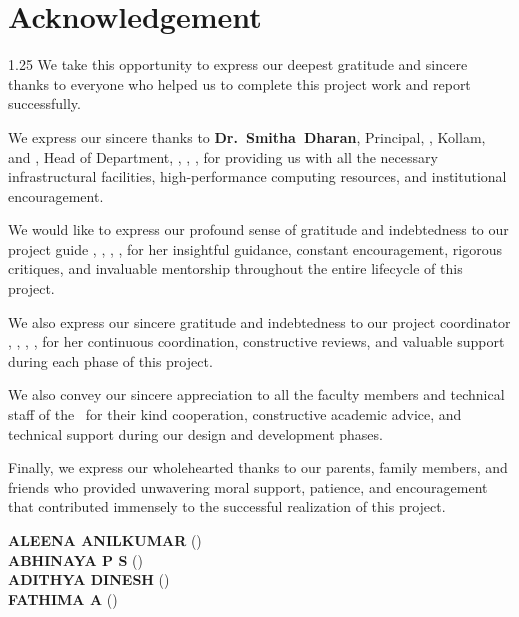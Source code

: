 \chapter*{Acknowledgement}%
%
\vspace{-15pt}

\begin{spacing}{1.25}
\noindent We take this opportunity to express our deepest gratitude and sincere thanks to everyone who helped us to complete this project work and report successfully.

\vspace{6pt}

\noindent We express our sincere thanks to \mbox{\textbf{Dr.~Smitha Dharan}}, Principal, \college, Kollam, and \mbox{\textbf{\hod}}, Head of Department, \dept, \college, \collegeplace, for providing us with all the necessary infrastructural facilities, high-performance computing resources, and institutional encouragement.

\vspace{6pt}

\noindent We would like to express our profound sense of gratitude and indebtedness to our project guide \mbox{\textbf{\guide}}, \guidedes, \dept, \college, for her insightful guidance, constant encouragement, rigorous critiques, and invaluable mentorship throughout the entire lifecycle of this project.

\vspace{6pt}

\noindent We also express our sincere gratitude and indebtedness to our project coordinator \mbox{\textbf{\coordinator}}, \coordinatordes, \dept, \college, for her continuous coordination, constructive reviews, and valuable support during each phase of this project.

\vspace{6pt}

\noindent We also convey our sincere appreciation to all the faculty members and technical staff of the \dept\ for their kind cooperation, constructive academic advice, and technical support during our design and development phases.

\vspace{6pt}

\noindent Finally, we express our wholehearted thanks to our parents, family members, and friends who provided unwavering moral support, patience, and encouragement that contributed immensely to the successful realization of this project.

\vspace*{14pt}
\begin{flushright}
	\textbf{ALEENA ANILKUMAR} (\rollnoA) \\[3pt]
	\textbf{ABHINAYA P S} (\rollnoB) \\[3pt]
	\textbf{ADITHYA DINESH} (\rollnoC) \\[3pt]
	\textbf{FATHIMA A} (\rollnoD)
\end{flushright}
\end{spacing}

\thispagestyle{plain}
